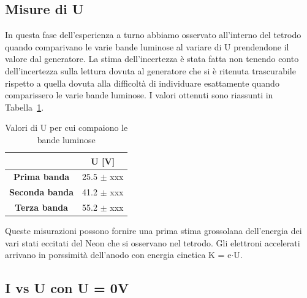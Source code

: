 \documentclass[10pt,a4paper]{article}
\begin{document}
\subsection*{Misure di U}
In questa fase dell'esperienza a turno abbiamo osservato all'interno del tetrodo quando comparivano le varie bande luminose al variare di U prendendone il valore dal generatore. La stima dell'incertezza è stata fatta non tenendo conto dell'incertezza sulla lettura dovuta al generatore che si è ritenuta trascurabile rispetto a quella dovuta alla difficoltà di individuare esattamente quando comparissero le varie bande luminose. %
I valori ottenuti sono riassunti in Tabella~\ref{tab:ua}. \newpage
\begin{table}[h]
	\centering
	\caption{\small Valori di U per cui compaiono le bande luminose}
	\vspace{1mm}
	\begin{tabular}{cc}\hline
	& \textbf{U\ped{A} [V]} \\
	\hline\hline
	\textbf{Prima banda} & 25.5 $\pm$ xxx  \\
	\textbf{Seconda banda} & 41.2 $\pm$ xxx \\
	\textbf{Terza banda} & 55.2 $\pm$ xxx \\ \hline
	\end{tabular}
	\label{tab:ua}
\end{table}
\noindent Queste misurazioni possono fornire una prima stima grossolana dell'energia dei vari stati eccitati del Neon che si osservano nel tetrodo. Gli elettroni accelerati arrivano in porssimità dell'anodo con energia cinetica K = e$\cdot$U.

\subsection*{I vs U con U = 0V}
\end{document}
